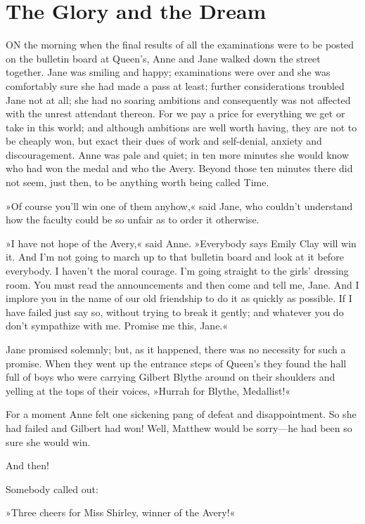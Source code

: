 \chapter{The Glory and the Dream}

ON the morning when the final results of all the examinations were to be posted on the bulletin board at Queen's, Anne and Jane walked down the street together. Jane was smiling and happy; examinations were over and she was comfortably sure she had made a pass at least; further considerations troubled Jane not at all; she had no soaring ambitions and consequently was not affected with the unrest attendant thereon. For we pay a price for everything we get or take in this world; and although ambitions are well worth having, they are not to be cheaply won, but exact their dues of work and self-denial, anxiety and discouragement. Anne was pale and quiet; in ten more minutes she would know who had won the medal and who the Avery. Beyond those ten minutes there did not seem, just then, to be anything worth being called Time.

»Of course you'll win one of them anyhow,« said Jane, who couldn't understand how the faculty could be so unfair as to order it otherwise.

»I have not hope of the Avery,« said Anne. »Everybody says Emily Clay will win it. And I'm not going to march up to that bulletin board and look at it before everybody. I haven't the moral courage. I'm going straight to the girls' dressing room. You must read the announcements and then come and tell me, Jane. And I implore you in the name of our old friendship to do it as quickly as possible. If I have failed just say so, without trying to break it gently; and whatever you do don't sympathize with me. Promise me this, Jane.«

Jane promised solemnly; but, as it happened, there was no necessity for such a promise. When they went up the entrance steps of Queen's they found the hall full of boys who were carrying Gilbert Blythe around on their shoulders and yelling at the tops of their voices, »Hurrah for Blythe, Medallist!«

For a moment Anne felt one sickening pang of defeat and disappointment. So she had failed and Gilbert had won! Well, Matthew would be sorry—he had been so sure she would win.

And then!

Somebody called out:

»Three cheers for Miss Shirley, winner of the Avery!«


